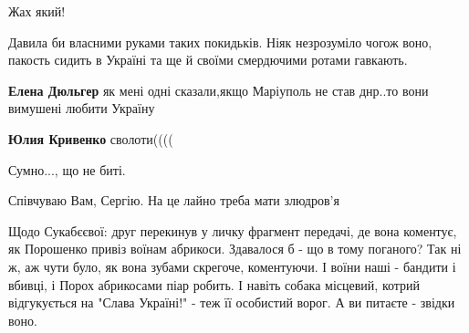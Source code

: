 \begin{itemize}
Жах який!

 
Давила би власними руками таких покидьків. Ніяк незрозуміло чогож воно, пакость сидить в Україні та ще й своїми смердючими ротами гавкають.

\begin{itemize}
 
\textbf{Елена Дюльгер} як мені одні сказали,якщо Маріуполь не став днр..то вони вимушені любити Україну

 
\textbf{Юлия Кривенко} сволоти((((
\end{itemize}

 
Сумно..., що не биті.

 
Співчуваю Вам, Сергію. На це лайно треба мати злюдров'я

 

Щодо Сукабєєвої: друг перекинув у личку фрагмент передачі, де вона коментує, як
Порошенко привіз воїнам абрикоси. Здавалося б - що в тому поганого? Так ні ж,
аж чути було, як вона зубами скрегоче, коментуючи. І воїни наші - бандити і
вбивці, і Порох абрикосами піар робить. І навіть собака місцевий, котрий
відгукується на "Слава Україні!" - теж її особистий ворог. А ви питаєте -
звідки воно.



\end{itemize}
